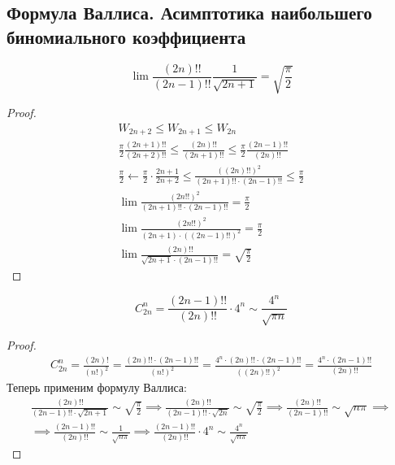 \subsection{Формула Валлиса. Асимптотика наибольшего биномиального коэффициента}

\begin{theorem}
    \begin{equation*}
        \lim \frac{(2n)!!}{(2n - 1)!!}\frac{1}{\sqrt{2n + 1}} = \sqrt{\frac{\pi}{2}}
    \end{equation*}
\end{theorem}
\begin{proof}
  \begin{equation*}
    \begin{gathered}
      W_{2n + 2} \leq W_{2n + 1} \leq W_{2n} \\
      \frac{\pi}{2} \frac{(2n + 1)!!}{(2n + 2)!!} \leq \frac{(2n)!!}{(2n + 1)!!} \leq \frac{\pi}{2} \frac{(2n - 1)!!}{(2n)!!} \\
      \frac{\pi}{2} \leftarrow \frac{\pi}{2} \cdot \frac{2n + 1}{2n + 2} \leq \frac{((2n)!!)^2}{(2n + 1)!!\cdot(2n - 1)!!} \leq \frac{\pi}{2} \\
      \lim \frac{(2n!!)^2}{(2n + 1)!!\cdot(2n - 1)!!} = \frac{\pi}{2} \\
      \lim \frac{(2n!!)^2}{(2n + 1)\cdot((2n - 1)!!)^2} = \frac{\pi}{2} \\
      \lim \frac{(2n)!!}{\sqrt{2n + 1} \cdot (2n - 1)!!} = \sqrt{\frac{\pi}{2}}
    \end{gathered}
  \end{equation*}
\end{proof}

\begin{follow}
  \begin{equation*}
    C_{2n}^{n} = \frac{(2n - 1)!!}{(2n)!!} \cdot 4^n \sim \frac{4^n}{\sqrt{\pi n}}
  \end{equation*}
\end{follow}
\begin{proof}
  \begin{equation*}
    \begin{gathered}
      C_{2n}^{n} =
      \frac{(2n)!}{(n!)^2} =
      \frac{(2n)!! \cdot (2n - 1)!!}{(n!)^2} =
      \frac{4^n \cdot (2n)!! \cdot (2n - 1)!!}{((2n)!!)^2} =
      \frac{4^n \cdot (2n - 1)!!}{(2n)!!}
    \end{gathered}
  \end{equation*}
  Теперь применим формулу Валлиса:
  \begin{equation*}
    \begin{gathered}
        \frac{(2n)!!}{(2n - 1)!! \cdot \sqrt{2n + 1}} \sim \sqrt{\frac{\pi}{2}}
        \implies
        \frac{(2n)!!}{(2n - 1)!! \cdot \sqrt{2n}} \sim \sqrt{\frac{\pi}{2}}
        \implies
        \frac{(2n)!!}{(2n - 1)!!} \sim \sqrt{n\pi}
        \implies \\
        \implies
        \frac{(2n - 1)!!}{(2n)!!} \sim \frac{1}{\sqrt{n\pi}}
        \implies
        \frac{(2n - 1)!!}{(2n)!!} \cdot 4^n \sim \frac{4^n}{\sqrt{n\pi}}
    \end{gathered}
  \end{equation*}
\end{proof}